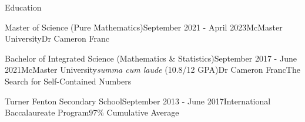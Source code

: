 \begin{rSection}{Education}

\begin{edSubsectionFull}{Master of Science (Pure Mathematics)}{September 2021 - April 2023}{McMaster University}{}{Dr Cameron Franc}{}
\end{edSubsectionFull}



\begin{edSubsectionHonours}{Bachelor of Integrated Science (Mathematics \& Statistics)}{September 2017 - June 2021}{McMaster University}{\textit{summa cum laude} (10.8/12 GPA)}{Dr Cameron Franc}{The Search for Self-Contained Numbers}
\end{edSubsectionHonours}


\begin{edSubsectionMin}{Turner Fenton Secondary School}{September 2013 - June 2017}{International Baccalaureate Program}{97\% Cumulative Average}
\end{edSubsectionMin}

\end{rSection}